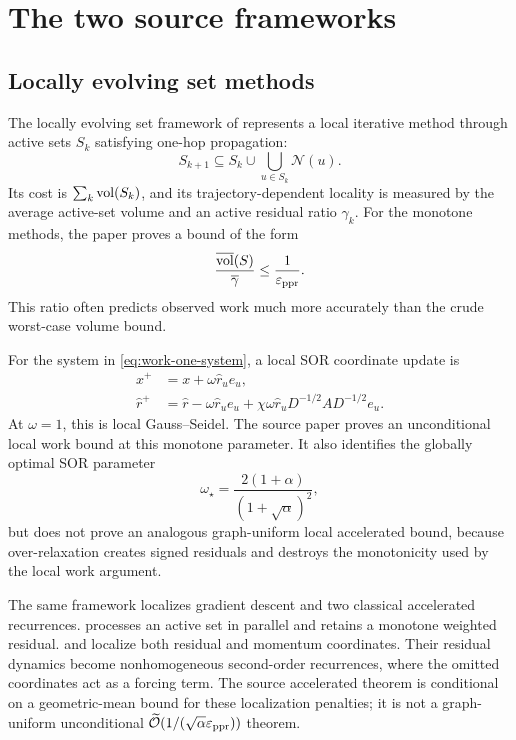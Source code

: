 \section{The two source frameworks}
\label{sec:source-frameworks}

\subsection{Locally evolving set methods}

The locally evolving set framework of \citet{zhou2024iterative} represents a
local iterative method through active sets \(S_k\) satisfying one-hop
propagation:
\begin{equation}
    S_{k+1}
    \subseteq
    S_k\cup\bigcup_{u\in S_k}\mathcal N(u).
    \label{eq:one-hop-evolution}
\end{equation}
Its cost is \(\sum_k\operatorname{vol}(S_k)\), and its trajectory-dependent locality is
measured by the average active-set volume and an active residual ratio
\(\gamma_k\).  For the monotone methods, the paper proves a bound of the form
\begin{equation}
    \frac{\overline{\operatorname{vol}}(S)}{\overline\gamma}
    \leq \frac{1}{\varepsilon_{\mathrm{ppr}}}.
    \label{eq:work-one-locality}
\end{equation}
This ratio often predicts observed work much more accurately than the crude
worst-case volume bound.

For the system in \cref{eq:work-one-system}, a local SOR coordinate update is
\begin{align}
    x^+&=x+\omega\widehat r_u e_u,
    \label{eq:locsor-work-one-x}\\
    \widehat r^+
    &=\widehat r-\omega\widehat r_u e_u
      +\chi\omega\widehat r_u D^{-1/2}AD^{-1/2}e_u.
    \label{eq:locsor-work-one-r}
\end{align}
At \(\omega=1\), this is local Gauss--Seidel.  The source paper proves an
unconditional local work bound at this monotone parameter.  It also identifies
the globally optimal SOR parameter
\begin{equation}
    \omega_\star
    =\frac{2(1+\alpha)}{(1+\sqrt\alpha)^2},
    \label{eq:optimal-sor}
\end{equation}
but does not prove an analogous graph-uniform local accelerated bound, because
over-relaxation creates signed residuals and destroys the monotonicity used by
the local work argument.

The same framework localizes gradient descent and two classical accelerated
recurrences.  \LOCGD processes an active set in parallel and retains a
monotone weighted residual.  \LOCCH and \LOCHB localize both residual and
momentum coordinates.  Their residual dynamics become nonhomogeneous
second-order recurrences, where the omitted coordinates act as a forcing term.
The source accelerated theorem is conditional on a geometric-mean bound for
these localization penalties; it is not a graph-uniform unconditional
\(\widetilde{\mathcal O}(1/(\sqrt\alpha\varepsilon_{\mathrm{ppr}}))\) theorem.

